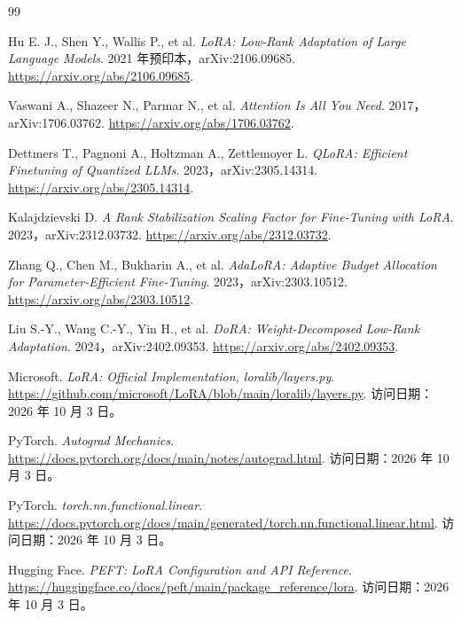 \documentclass[UTF8,12pt,a4paper,fontset=fandol]{ctexart}
\begin{document}
\begin{thebibliography}{99}

Hu E. J., Shen Y., Wallis P., et al.
\textit{LoRA: Low-Rank Adaptation of Large Language Models}.
2021 年预印本，arXiv:2106.09685.
\url{https://arxiv.org/abs/2106.09685}.

Vaswani A., Shazeer N., Parmar N., et al.
\textit{Attention Is All You Need}.
2017，arXiv:1706.03762.
\url{https://arxiv.org/abs/1706.03762}.

Dettmers T., Pagnoni A., Holtzman A., Zettlemoyer L.
\textit{QLoRA: Efficient Finetuning of Quantized LLMs}.
2023，arXiv:2305.14314.
\url{https://arxiv.org/abs/2305.14314}.

Kalajdzievski D.
\textit{A Rank Stabilization Scaling Factor for Fine-Tuning with LoRA}.
2023，arXiv:2312.03732.
\url{https://arxiv.org/abs/2312.03732}.

Zhang Q., Chen M., Bukharin A., et al.
\textit{AdaLoRA: Adaptive Budget Allocation for Parameter-Efficient Fine-Tuning}.
2023，arXiv:2303.10512.
\url{https://arxiv.org/abs/2303.10512}.

Liu S.-Y., Wang C.-Y., Yin H., et al.
\textit{DoRA: Weight-Decomposed Low-Rank Adaptation}.
2024，arXiv:2402.09353.
\url{https://arxiv.org/abs/2402.09353}.

Microsoft.
\textit{LoRA: Official Implementation, loralib/layers.py}.
\url{https://github.com/microsoft/LoRA/blob/main/loralib/layers.py}.
访问日期：2026 年 10 月 3 日。

PyTorch.
\textit{Autograd Mechanics}.
\url{https://docs.pytorch.org/docs/main/notes/autograd.html}.
访问日期：2026 年 10 月 3 日。

PyTorch.
\textit{torch.nn.functional.linear}.
\url{https://docs.pytorch.org/docs/main/generated/torch.nn.functional.linear.html}.
访问日期：2026 年 10 月 3 日。

Hugging Face.
\textit{PEFT: LoRA Configuration and API Reference}.
\url{https://huggingface.co/docs/peft/main/package_reference/lora}.
访问日期：2026 年 10 月 3 日。

\end{thebibliography}
\end{document}
